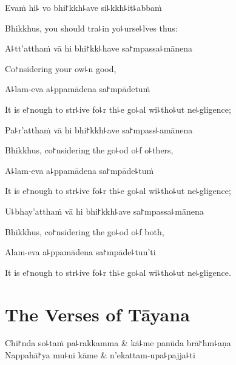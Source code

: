 Evaṁ hi꜕ vo bhi꜓kkh꜕ave si꜕kkh꜕it꜕abbaṁ

\begin{english}
  Bhikkhus, you should tra꜕in yo꜕urse꜕lves thus:
\end{english}

A꜕tt'atthaṁ vā hi bhi꜓kk꜕have sa꜓mpassa꜕mānena

\begin{english}
  Co꜓nsidering your ow꜕n good,
\end{english}

A꜕lam-eva a꜕ppamādena sa꜓mpādetuṁ

\begin{english}
  It is e꜓nough to str꜕ive fo꜕r th꜕e go꜕al wi꜕tho꜕ut ne꜕gligence;
\end{english}

Pa꜕r'atthaṁ vā hi bhi꜓kkh꜕ave sa꜓mpass꜕amānena

\begin{english}
  Bhikkhus, co꜓nsidering the go꜕od o꜕f o꜕thers,
\end{english}

A꜕lam-eva a꜕ppamādena sa꜓mpāde꜕tuṁ

\begin{english}
  It is e꜓nough to str꜕ive fo꜕r th꜕e go꜕al wi꜕tho꜕ut ne꜕gligence;
\end{english}

U꜕bhay'atthaṁ vā hi bhi꜓kkh꜕ave sa꜓mpassa꜕mānena

\begin{english}
  Bhikkhus, co꜓nsidering the go꜕od o꜕f both,
\end{english}

Alam-eva a꜕ppamādena sa꜓mpāde꜕tun'ti

\begin{english}
  It is e꜓nough to str꜕ive fo꜕r th꜕e go꜕al wi꜕tho꜕ut ne꜕gligence.
\end{english}

\chapter{The Verses of Tāyana}%


\begin{leader}
\end{leader}

\begin{twochants}
  Chi꜓nda so꜕taṁ pa꜕rakkamma & kā꜕me panūda brā꜓hm꜕aṇa \\
  Nappahā꜓ya mu꜕ni kāme & n'ekattam-upa꜕pajja꜕ti \\
\end{twochants}


